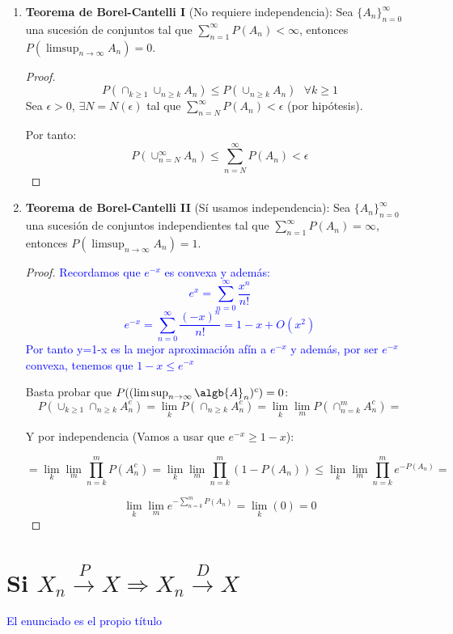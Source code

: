 \documentclass{apuntes}
\begin{document}
\begin{enumerate}
\item \textbf{Teorema de Borel-Cantelli I} (No requiere independencia): Sea $\{A_n\}_{n=0}^{\infty}$ una sucesión de conjuntos tal que $\sum_{n=1}^{\infty}P(A_n)< \infty$, entonces $P(\limsup_{n \rightarrow \infty}A_n)=0$.
\begin{proof}
\[
P(\cap_{k\geq 1}\cup_{n\geq k}A_n) \leq P(\cup_{n\geq k}A_n) \text{ } \forall k\geq 1
\]
Sea $\epsilon >0$, $\exists N=N(\epsilon)$ tal que $ \sum_{n=N}^{\infty}P(A_n)<\epsilon$ (por hipótesis).

Por tanto:
\[
P(\cup_{n=N}^{\infty}A_n) \leq \sum_{n=N}^{\infty}P(A_n)<\epsilon
\]
\end{proof}

\item \textbf{Teorema de Borel-Cantelli II} (Sí usamos independencia): Sea $\{A_n\}_{n=0}^{\infty}$ una sucesión de conjuntos independientes tal que $\sum_{n=1}^{\infty}P(A_n)= \infty$, entonces $P(\limsup_{n \rightarrow \infty}A_n)=1$.

\begin{proof}

\textcolor{blue}{Recordamos que $e^{-x}$ es convexa y además:
\[
e^x=\sum_{n=0}^{\infty}\frac{x^n}{n!}
\]
\[
e^{-x}=\sum_{n=0}^{\infty}\frac{(-x)^n}{n!}=1-x+O(x^2)
\]
Por tanto y=1-x es la mejor aproximación afín a $e^{-x}$ y además, por ser $e^{-x}$ convexa, tenemos que $1-x \leq e^{-x}$
}

Basta probar que $P((\limsup_{n \rightarrow \infty} \algb{A}_n)^c)=0$:
\[
P(\cup_{k \geq 1}\cap_{n \geq k}A_n^c)= \lim_k P(\cap_{n\geq k}A_n^c)= \lim_k \lim_m P(\cap_{n=k}^m A_n^c)=
\]

Y por independencia (Vamos a usar que $e^{-x} \geq 1-x$):

\[
=\lim_k \lim_m \prod_{n=k}^m P(A_n^c)=\lim_k \lim_m \prod_{n=k}^m (1-P(A_n)) \leq \lim_k \lim_m \prod_{n=k}^m e^{-P(A_n)}=
\]

\[
\lim_k \lim_m e^{-\sum_{n=k}^m P(A_n)}=\lim_k(0)=0
\]
\end{proof}

\end{enumerate}


\section{Si $X_n \stackrel{P}{\rightarrow} X  \Rightarrow X_n \stackrel{D}{\rightarrow} X$}
\textcolor{blue}{El enunciado es el propio título}
\end{document}
